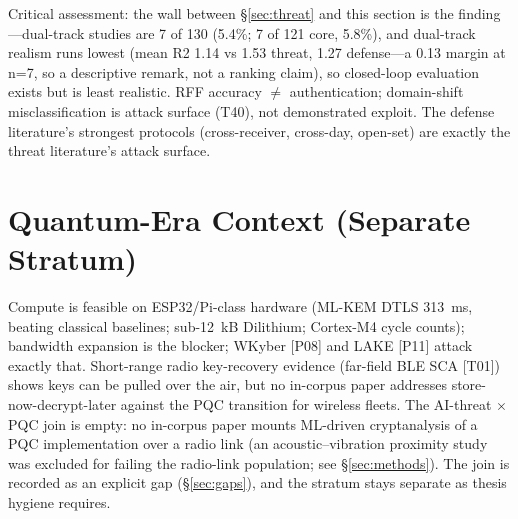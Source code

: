 \documentclass[11pt,a4paper]{article}
\begin{document}
Critical assessment: the wall between \S\ref{sec:threat} and this section is the finding---dual-track studies are 7 of 130 (5.4\%; 7 of 121 core, 5.8\%), and dual-track realism runs lowest (mean R2 1.14 vs 1.53 threat, 1.27 defense---a 0.13 margin at n=7, so a descriptive remark, not a ranking claim), so closed-loop evaluation exists but is least realistic. RFF accuracy $\ne$ authentication; domain-shift misclassification is attack surface (T40), not demonstrated exploit. The defense literature's strongest protocols (cross-receiver, cross-day, open-set) are exactly the threat literature's attack surface.

\section{Quantum-Era Context (Separate Stratum)}
\label{sec:pqc}
Compute is feasible on ESP32/Pi-class hardware (ML-KEM DTLS 313~ms, beating classical baselines; sub-12~kB Dilithium; Cortex-M4 cycle counts); bandwidth expansion is the blocker; WKyber [P08] and LAKE [P11] attack exactly that. Short-range radio key-recovery evidence (far-field BLE SCA [T01]) shows keys can be pulled over the air, but no in-corpus paper addresses store-now-decrypt-later against the PQC transition for wireless fleets. The AI-threat $\times$ PQC join is empty: no in-corpus paper mounts ML-driven cryptanalysis of a PQC implementation over a radio link (an acoustic--vibration proximity study was excluded for failing the radio-link population; see \S\ref{sec:methods}). The join is recorded as an explicit gap (\S\ref{sec:gaps}), and the stratum stays separate as thesis hygiene requires.
\end{document}
